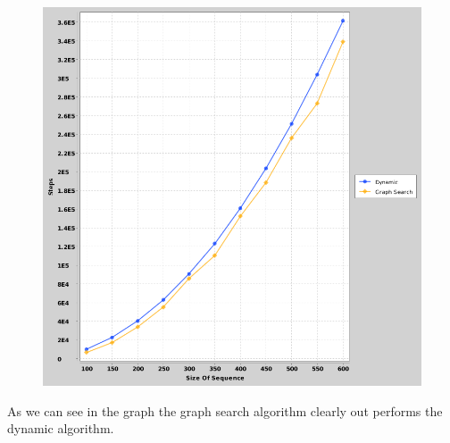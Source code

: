 \documentclass{article}
\begin{document}
		\begin{figure}[h]
			\vspace{3mm}
			\begin{center}
				\includegraphics[scale=0.4]{DynamicGraphComparason.png}
			\end{center}
		\end{figure}
		
		As we can see in the graph the graph search algorithm clearly out performs the dynamic algorithm.
		
  			
\end{document}
